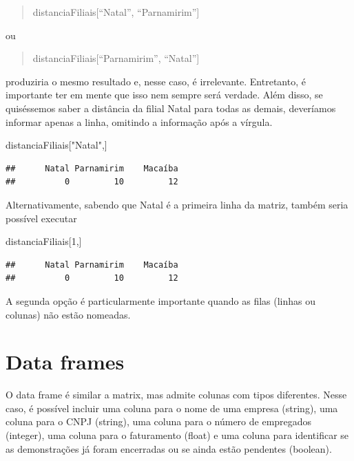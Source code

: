 \documentclass[
]{book}
\newenvironment{Shaded}{\begin{snugshade}}{\end{snugshade}}
\newcommand{\DecValTok}[1]{\textcolor[rgb]{0.00,0.00,0.81}{#1}}
\newcommand{\NormalTok}[1]{#1}
\newcommand{\StringTok}[1]{\textcolor[rgb]{0.31,0.60,0.02}{#1}}
\begin{document}
\begin{quote}
distanciaFiliais{[}``Natal'', ``Parnamirim''{]}
\end{quote}

ou

\begin{quote}
distanciaFiliais{[}``Parnamirim'', ``Natal''{]}
\end{quote}

produziria o mesmo resultado e, nesse caso, é irrelevante. Entretanto, é importante ter em mente que isso nem sempre será verdade. Além disso, se quiséssemos saber a distância da filial Natal para todas as demais, deveríamos informar apenas a linha, omitindo a informação após a vírgula.

\begin{Shaded}
\begin{Highlighting}[]
\NormalTok{distanciaFiliais[}\StringTok{"Natal"}\NormalTok{,]}
\end{Highlighting}
\end{Shaded}

\begin{verbatim}
##      Natal Parnamirim    Macaíba 
##          0         10         12
\end{verbatim}

Alternativamente, sabendo que Natal é a primeira linha da matriz, também seria possível executar

\begin{Shaded}
\begin{Highlighting}[]
\NormalTok{distanciaFiliais[}\DecValTok{1}\NormalTok{,]}
\end{Highlighting}
\end{Shaded}

\begin{verbatim}
##      Natal Parnamirim    Macaíba 
##          0         10         12
\end{verbatim}

A segunda opção é particularmente importante quando as filas (linhas ou colunas) não estão nomeadas.

\hypertarget{data-frames}{%
\section{Data frames}\label{data-frames}}

O data frame é similar a matrix, mas admite colunas com tipos diferentes. Nesse caso, é possível incluir uma coluna para o nome de uma empresa (string), uma coluna para o CNPJ (string), uma coluna para o número de empregados (integer), uma coluna para o faturamento (float) e uma coluna para identificar se as demonstrações já foram encerradas ou se ainda estão pendentes (boolean).
\end{document}
